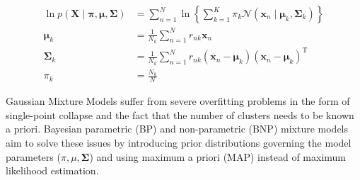 \begin{secDefinition}
\begin{align}
\ln p(\mathbf{X} \mid \boldsymbol{\pi}, \boldsymbol{\mu}, \mathbf{\Sigma}) &= \sum_{n=1}^{N} \ln \left\{\sum_{k=1}^{K} \pi_{k} \mathcal{N}\left(\mathbf{x}_{n} \mid \boldsymbol{\mu}_{k}, \boldsymbol{\Sigma}_{k}\right)\right\} \label{eq:gmm_ll} \\
\boldsymbol{\mu}_{k} &= \frac{1}{N_{k}} \sum_{n=1}^{N} r_{nk} \mathbf{x}_{n} \label{eq:gm_mu} \\
\boldsymbol{\Sigma}_{k} &=\frac{1}{N_{k}} \sum_{n=1}^{N} r_{nk} \left(\mathbf{x}_{n}-\boldsymbol{\mu}_{k}\right)\left(\mathbf{x}_{n}-\boldsymbol{\mu}_{k}\right)^{\mathrm{T}} \label{eq:gm_cov} \\
\pi_{k} &= \frac{N_{k}}{N} \label{eq:gm_pi}
\end{align}



\end{secDefinition}

Gaussian Mixture Models suffer from severe overfitting problems in the form of single-point collapse and the fact that the number of clusters needs to be known a priori.
Bayesian parametric (BP) and non-parametric (BNP) mixture models aim to solve these issues by introducing prior distributions governing the model parameters ($\pi, \mu, \boldsymbol{\Sigma}$) and using maximum a priori (MAP) instead of maximum likelihood estimation. 

